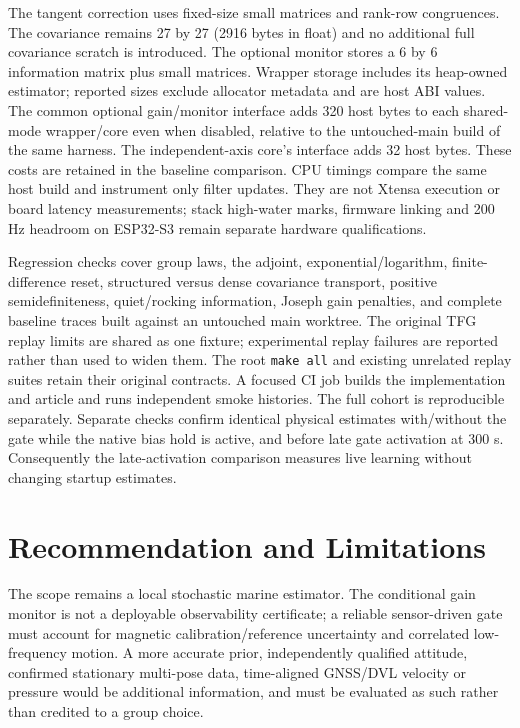 \documentclass[conference]{IEEEtran}
\begin{document}
The tangent correction uses fixed-size small matrices and rank-row
congruences. The covariance remains 27 by 27 (2916 bytes in float) and no
additional full covariance scratch is introduced. The optional monitor
stores a 6 by 6 information matrix plus small matrices. Wrapper storage
includes its heap-owned estimator; reported sizes exclude allocator
metadata and are host ABI values.
The common optional gain/monitor interface adds 320 host bytes to each
shared-mode wrapper/core even when disabled, relative to the untouched-main
build of the same harness. The independent-axis core's interface adds
32 host bytes. These costs are retained in the baseline comparison.
CPU timings compare the same host build
and instrument only filter updates. They are not Xtensa execution or board
latency measurements; stack high-water marks, firmware linking and 200 Hz
headroom on ESP32-S3 remain separate hardware qualifications.

Regression checks cover group laws, the adjoint, exponential/logarithm,
finite-difference reset, structured versus dense covariance transport,
positive semidefiniteness, quiet/rocking information, Joseph gain penalties,
and complete baseline traces built against an untouched main worktree.
The original TFG replay limits are shared as one fixture; experimental
replay failures are reported rather than used to widen them. The root
\texttt{make all} and existing unrelated replay suites retain their original
contracts. A focused CI job builds the implementation and article and runs
independent smoke histories. The full cohort is reproducible separately.
Separate checks confirm identical physical estimates with/without the gate
while the native bias hold is active, and before late gate activation at
300 s. Consequently the late-activation comparison measures live learning
without changing startup estimates.
\ValidationResults

\section{Recommendation and Limitations}
\StudyRecommendation
The scope remains a local stochastic marine estimator. The conditional
gain monitor is not a deployable observability certificate; a reliable
sensor-driven gate must account for magnetic calibration/reference
uncertainty and correlated low-frequency motion. A more accurate prior,
independently qualified attitude, confirmed stationary multi-pose data,
time-aligned GNSS/DVL velocity or pressure would be additional information,
and must be evaluated as such rather than credited to a group choice.
\end{document}
